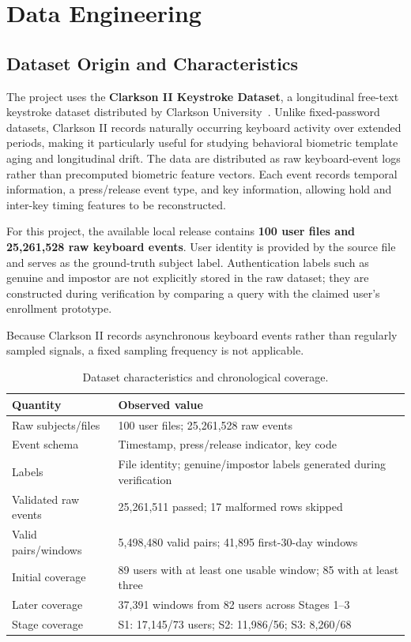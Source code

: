 \documentclass[conference]{IEEEtran}
\begin{document}
\section{Data Engineering}

\subsection{Dataset Origin and Characteristics}

The project uses the \textbf{Clarkson II Keystroke Dataset}, a longitudinal free-text keystroke dataset distributed by Clarkson University~\cite{clarkson}. Unlike fixed-password datasets, Clarkson II records naturally occurring keyboard activity over extended periods, making it particularly useful for studying behavioral biometric template aging and longitudinal drift. The data are distributed as raw keyboard-event logs rather than precomputed biometric feature vectors. Each event records temporal information, a press/release event type, and key information, allowing hold and inter-key timing features to be reconstructed.

For this project, the available local release contains \textbf{100 user files and 25,261,528 raw keyboard events}. User identity is provided by the source file and serves as the ground-truth subject label. Authentication labels such as genuine and impostor are not explicitly stored in the raw dataset; they are constructed during verification by comparing a query with the claimed user's enrollment prototype.

Because Clarkson II records asynchronous keyboard events rather than regularly sampled signals, a fixed sampling frequency is not applicable.

\begin{table}[htbp]
\caption{Dataset characteristics and chronological coverage.}
\label{tab:data}
\centering
\scriptsize
\begin{tabular}{p{}p{}}
\toprule
\textbf{Quantity} & \textbf{Observed value}\\
\midrule
Raw subjects/files & 100 user files; 25,261,528 raw events\\
Event schema & Timestamp, press/release indicator, key code\\
Labels & File identity; genuine/impostor labels generated during verification\\
Validated raw events & 25,261,511 passed; 17 malformed rows skipped\\
Valid pairs/windows & 5,498,480 valid pairs; 41,895 first-30-day windows\\
Initial coverage & 89 users with at least one usable window; 85 with at least three\\
Later coverage & 37,391 windows from 82 users across Stages 1--3\\
Stage coverage & S1: 17,145/73 users; S2: 11,986/56; S3: 8,260/68\\
\bottomrule
\end{tabular}
\end{table}
\end{document}
